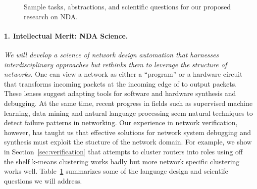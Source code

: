
\begin{figure}[t]
\centerline{}
\caption{Sample tasks, abstractions, and scientific questions for our
  proposed research on NDA.}
\vspace{2mm}
\label{scientificquestions}
\end{figure}


\paragraph*{1. Intellectual Merit: NDA Science.} {\em We will develop a science of network design automation that harnesses interdisciplinary approaches but rethinks them to leverage the structure of networks.} One can view a network as either a ``program'' or a hardware circuit that transforms incoming packets at the incoming edge of to output packets.  These lenses suggest adapting tools
for software and hardware synthesis and debugging.  At the same time, recent progress in fields such as supervised machine learning, data mining and natural language processing seem natural techniques to detect failure patterns in networking.  Our experience in network verification, however, has taught us
that effective solutions for network system debugging and synthesis must exploit the stucture of the network domain.  For example, we show in Section~\ref{sec:verification} that attempts to cluster routers into roles using off  the
shelf k-means clustering works badly but more network specific clustering
works well. Table~\ref{scientificquestions} summarizes some of the language design and scientifc questions we will address.

